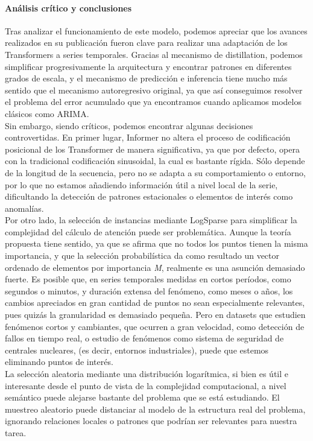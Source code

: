 \paragraph{Análisis crítico y conclusiones}
Tras analizar el funcionamiento de este modelo, podemos apreciar que los avances realizados en su publicación fueron clave para realizar una adaptación de los Transformers a series temporales. Gracias al mecanismo de distillation, podemos simplificar progresivamente la arquitectura y encontrar patrones en diferentes grados de escala, y el mecanismo de predicción e inferencia tiene mucho más sentido que el mecanismo autoregresivo original, ya que así conseguimos resolver el problema del error acumulado que ya encontramos cuando aplicamos modelos clásicos como ARIMA.\\

Sin embargo, siendo críticos, podemos encontrar algunas decisiones controvertidas. En primer lugar, Informer no altera el proceso de codificación posicional de los Transformer de manera significativa, ya que por defecto, opera con la tradicional codificación sinusoidal, la cual es bastante rígida. Sólo depende de la longitud de la secuencia, pero no se adapta a su comportamiento o entorno, por lo que no estamos añadiendo información útil a nivel local de la serie, dificultando la detección de patrones estacionales o elementos de interés como anomalías.\\

Por otro lado, la selección de instancias mediante LogSparse para simplificar la complejidad del cálculo de atención puede ser problemática. Aunque la teoría propuesta tiene sentido, ya que se afirma que no todos los puntos tienen la misma importancia, y que la selección probabilística da como resultado un vector ordenado de elementos por importancia \textit{M}, realmente es una asunción demasiado fuerte. Es posible que, en series temporales medidas en cortos períodos, como segundos o minutos, y duración extensa del fenómeno, como meses o años, los cambios apreciados en gran cantidad de puntos no sean especialmente relevantes, pues quizás la granularidad es demasiado pequeña. Pero en datasets que estudien fenómenos cortos y cambiantes, que ocurren a gran velocidad, como detección de fallos en tiempo real, o estudio de fenómenos como sistema de seguridad de centrales nucleares, (es decir, entornos industriales), puede que estemos eliminando puntos de interés.\\

La selección aleatoria mediante una distribución logarítmica, si bien es útil e interesante desde el punto de vista de la complejidad computacional, a nivel semántico puede alejarse bastante del problema que se está estudiando. El muestreo aleatorio puede distanciar al modelo de la estructura real del problema, ignorando relaciones locales o patrones que podrían ser relevantes para nuestra tarea.\\

